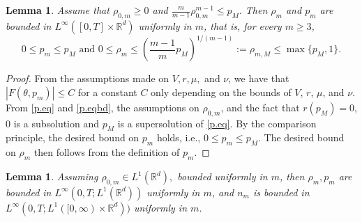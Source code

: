 \documentclass{amsart}
\newtheorem{lemma}[theorem]{Lemma}
\def\R{\mathbb R}
\begin{document}
\begin{lemma}
    Assume that $\rho_{0,m}\geq 0$ and $\frac{m}{m-1}\rho_{0,m}^{m-1}\leq p_M.$ Then $\rho_m$ and $p_m$ are bounded in $L^\infty([0,T]\times\R^d)$ uniformly in $m$, that is, for every $m \geq 3$,
    \begin{equation*}
        0\leq p_m \leq p_M \text{ and } 0\leq \rho_m \leq (\frac{m-1}{m}p_M)^{1/(m-1)}:=\rho_{m,M}\leq \max\{p_M,1\}.
    \end{equation*}
\end{lemma}
\begin{proof}
   
   From the assumptions made on $V, r, \mu,$ and $\nu$, we have that $|F(\theta,p_m)|\leq C$ for a constant $C$ only depending on the bounds of $V$, $r$, $\mu$, and $\nu$. From \eqref{p.eq} and \eqref{p.eqbd}, the assumptions on $\rho_{0,m}$, and the fact that $r(p_M)=0$, $0$ is a subsolution and $p_M$ is a supersolution of \eqref{p.eq}. 
    By the comparison principle, the desired bound on $p_m$ holds, i.e., $0\leq p_m \leq p_M$. The desired bound on $\rho_m$ then follows from the definition of $p_m$. 
\end{proof}
\begin{lemma}
    Assuming $\rho_{0,m}\in L^1(\R^d),$ bounded uniformly in $m$, then $\rho_m, p_m$ are bounded in $L^\infty(0,T;L^1(\R^d))$ uniformly in $m$, and $n_m$ is bounded in $L^\infty(0,T;L^1([0,\infty)\times \R^d))$ uniformly in $m$.
\end{lemma}
\end{document}
